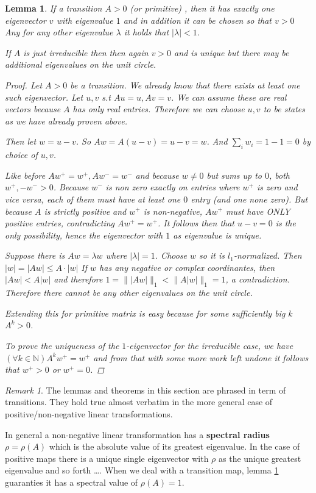 \documentclass[a4paper,10pt]{article}
\newcommand{\N}{\mathbb{N}}
\newcommand{\gt}{>}
\newcommand{\lt}{<}
\theoremstyle{definition}
\theoremstyle{remark}
\newtheorem{remark}{Remark}
\theoremstyle{plain}
\newtheorem{lemma}{Lemma}[section]
\begin{document}
\begin{lemma}
\label{lem:uniq1}
If a transition $A \gt 0$ (or primitive)
, then it has exactly
one eigenvector $v$ with eigenvalue $1$ and in addition it can be chosen so that $v > 0$
Any for any other eigenvalue
$\lambda$ it holds that $|\lambda| \lt 1$.

If $A$ is just irreducible then then again $v>0$ and is unique but there may be
additional eigenvalues on the unit circle.

\begin{proof}
Let $A \gt 0$ be a transition. We already know that there exists at least one such eigenvector.
Let $u,v$ s.t $Au=u, Av=v$. 
We can assume these are real vectors because $A$ has only real entries.
Therefore we can choose $u,v$
to be states as we have already proven above.

Then let $w=u-v$. So $Aw = A(u-v) = u-v = w$. 
And $\sum_i w_i = 1 - 1 = 0$ by choice of $u,v$.

Like before $Aw^+ = w^+, Aw^- = w^-$
and because $w \neq 0$ but sums up to $0$, both $w^+, -w^- > 0$.
Because $w^-$ is non zero exactly on entries where $w^+$ is zero and vice versa, 
each of them must have at least one $0$ entry (and one none zero). But because
$A$ is strictly positive and $w^+$ is non-negative, $Aw^+$ must have ONLY
positive entries, contradicting $Aw^+ = w^+$. It follows then that $u-v=0$ is
the only possibility, hence the eigenvector with $1$ as eigenvalue is unique.

Suppose there is $Aw = \lambda w$ where $| \lambda|=1$. Choose $w$ so it is
$l_1$-normalized. Then $|w| = |Aw| \leq A \cdot |w|$ If $w$ has any negative or
complex coordinantes, then $|Aw| \lt A|w|$ and therefore 
$1 = \| |Aw| \|_1 \lt \|A|w|\|_1 =1$, a contradiction. Therefore there cannot be
any other eigenvalues on the unit circle.

Extending this for primitive matrix is easy because for some sufficiently big
$k$ $A^k \gt 0$. 

To prove the uniqueness of the $1$-eigenvector for the irreducible case, we have
$(\forall k \in \N) A^kw^+ = w^+$ and from that with some more work left undone
it follows that $w^+ > 0$ or
$w^+ = 0$.
\qedsymbol

\end{proof}
\end{lemma}

\begin{remark}
\label{remark:rhoisone}
The lemmas and theorems in this section are phrased in term of transitions. They
hold true almost verbatim in the more general case of positive/non-negative
linear transformations.

In general a non-negative linear transformation has a \textbf{spectral radius}
$\rho = \rho(A)$ which is the absolute value of its greatest eigenvalue. In the case of
positive maps there is a unique single eigenvector with $\rho$ as the unique
greatest eigenvalue and so forth \dots. When we deal with a transition map,
lemma \ref{lem:uniq1} guaranties 
it has a spectral value of $\rho(A) = 1$.
\end{remark}
\end{document}
